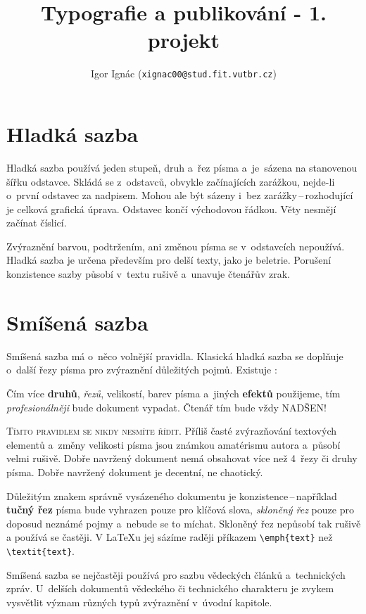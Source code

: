 \documentclass[a4paper, twocolumn, 10pt]{article}
\title{Typografie a publikování - 1. projekt}
\author{Igor Ignác (\texttt{xignac00@stud.fit.vutbr.cz})}
\date{}
\begin{document}
\maketitle

\section{Hladká sazba}
\label{sec:smooth}

Hladká sazba používá jeden stupeň, druh a~řez písma a~je~sázena na stanovenou šířku odstavce. Skládá se z~odstavců, obvykle začínajících zarážkou, nejde-li o~první odstavec za nadpisem. Mohou ale být sázeny i~bez zarážky\,--\,rozhodující je celková grafická úprava. Odstavec končí východovou řádkou. Věty nesmějí začínat číslicí.
\par
Zvýraznění barvou, podtržením, ani změnou písma se v~odstavcích nepoužívá. Hladká sazba je určena především pro delší texty, jako je beletrie. Porušení konzistence sazby působí v~textu rušivě a~unavuje čtenářův zrak.

\section{Smíšená sazba} \label{sec:mixed}

Smíšená sazba má o~něco volnější pravidla. Klasická hladká sazba se doplňuje o~další řezy písma pro zvýraznění důležitých pojmů. Existuje :

\begin{displayquote}

Čím více \textbf{druhů}, \textit{řezů}, {\footnotesize velikostí}, barev písma a~jiných{ \tiny \textbf{efektů}} použijeme, tím \emph{profesionálněji} bude dokument vypadat. Čtenář tím bude{ \LARGE vždy}{ \huge NADŠEN!}
\end{displayquote}

\textsc{Tímto pravidlem se nikdy nesmíte řídit.} Příliš časté zvýrazňování textových elementů a~změny velikosti písma jsou známkou amatérismu autora a~působí velmi rušivě. Dobře navržený dokument nemá obsahovat více než
4~řezy či druhy písma. Dobře navržený dokument je decentní, ne chaotický.
\par
Důležitým znakem správně vysázeného dokumentu je konzistence\,--\,například \textbf{tučný řez} písma bude vyhrazen pouze pro klíčová slova, \emph{skloněný řez} pouze pro doposud neznámé pojmy a~nebude se to míchat. Skloněný řez nepůsobí tak rušivě a používá se častěji. V \LaTeX u jej sázíme raději příkazem \verb|\emph{text}| než \verb|\textit{text}|.
\par
Smíšená sazba se nejčastěji používá pro sazbu vědeckých článků a~technických zpráv. U~delších dokumentů vědeckého či technického charakteru je zvykem vysvětlit význam různých typů zvýraznění v~úvodní kapitole.
\end{document}
